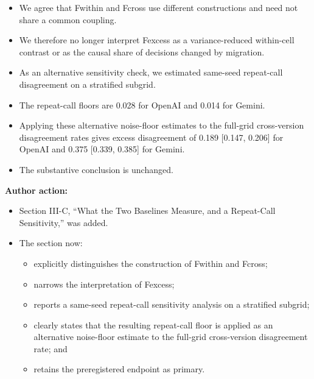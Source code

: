 \documentclass[11pt]{article}
\begin{document}
\begin{itemize}

\item We agree that Fwithin and Fcross use different constructions and need not share a common coupling.

\item We therefore no longer interpret Fexcess as a variance-reduced within-cell contrast or as the causal share of decisions changed by migration.

\item As an alternative sensitivity check, we estimated same-seed repeat-call disagreement on a stratified subgrid.

\item The repeat-call floors are 0.028 for OpenAI and 0.014 for Gemini.

\item Applying these alternative noise-floor estimates to the full-grid cross-version disagreement rates gives excess disagreement of 0.189 [0.147, 0.206] for OpenAI and 0.375 [0.339, 0.385] for Gemini.

\item The substantive conclusion is unchanged.

\end{itemize}

\textbf{Author action:}

\begin{itemize}

\item Section III-C, ``What the Two Baselines Measure, and a Repeat-Call Sensitivity,'' was added.

\item The section now:

\begin{itemize}

\item explicitly distinguishes the construction of Fwithin and Fcross;

\item narrows the interpretation of Fexcess;

\item reports a same-seed repeat-call sensitivity analysis on a stratified subgrid;

\item clearly states that the resulting repeat-call floor is applied as an alternative noise-floor estimate to the full-grid cross-version disagreement rate; and

\item retains the preregistered endpoint as primary.

\end{itemize}

\end{itemize}
\end{document}
